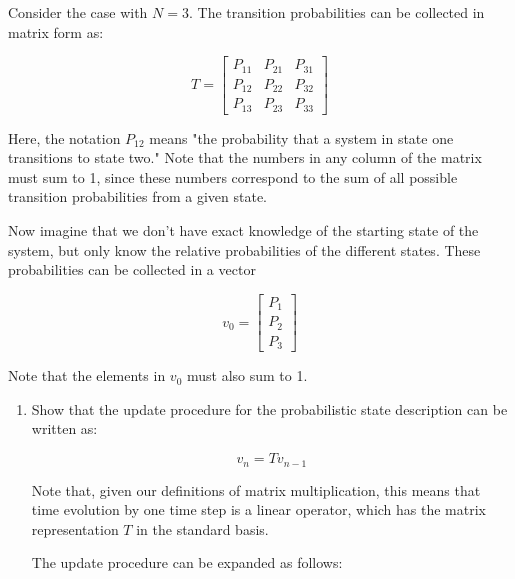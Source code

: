 \documentclass[fleqn]{article}
\makeatletter
\newenvironment{equationCenter}{\@fleqnfalse\begin{equation*}}{\end{equation*}}
\makeatother
\begin{document}
\begin{enumerate}[nolistsep]
		Consider the case with $N=3$. The transition probabilities can be collected in matrix form as:
		
		\begin{equationCenter}
			T = \begin{bmatrix}
				P_{11} & P_{21} & P_{31} \\
				P_{12} & P_{22} & P_{32} \\
				P_{13} & P_{23} & P_{33}
			\end{bmatrix}
		\end{equationCenter}
		
		Here, the notation $P_{12}$ means "the probability that a system in state one transitions to state
two." Note that the numbers in any column of the matrix must sum to 1, since these numbers correspond to the sum of all possible transition probabilities from a given state.

		Now imagine that we don't have exact knowledge of the starting state of the system, but only know the relative probabilities of the different states. These probabilities can be collected in a vector
		
		\begin{equationCenter}
			v_0 = \begin{bmatrix}
				P_1 \\ P_2 \\ P_3
			\end{bmatrix}
		\end{equationCenter}
		
		Note that the elements in $v_0$ must also sum to 1.
		
		\begin{enumerate}
			\item Show that the update procedure for the probabilistic state description can be written as:
			
			\begin{equationCenter}
				v_n = Tv_{n-1}
			\end{equationCenter}
			
			Note that, given our definitions of matrix multiplication, this means that time evolution by one time step is a linear operator, which has the matrix representation $T$ in the standard basis.
			
			The update procedure can be expanded as follows:
			

\end{enumerate}
\end{enumerate}
\end{document}
